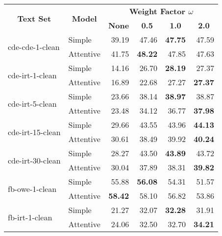 \begin{tabular}{| l | l | r | r | r | r |}
    \hline

    \multicolumn{1}{|c|}{\multirow{2}{*}{\textbf{Text Set}}} &
    \multicolumn{1}{|c|}{\multirow{2}{*}{\textbf{Model}}} &
    \multicolumn{4}{|c|}{\textbf{Weight Factor $\omega$}} \\

    &
    &
    \multicolumn{1}{|c|}{\textbf{None}} &
    \multicolumn{1}{|c|}{\textbf{0.5}} &
    \multicolumn{1}{|c|}{\textbf{1.0}} &
    \multicolumn{1}{|c|}{\textbf{2.0}} \\

    \hline \hline

    \multirow{2}{*}{cde-cde-1-clean}
    & Simple    & 39.19 & 47.46 & \textbf{47.75} & 47.59 \\
    & Attentive & 41.75 & \textbf{48.22} & 47.85 & 47.63 \\ \hline

    \multirow{2}{*}{cde-irt-1-clean}
    & Simple    & 14.16 & 26.70 & \textbf{28.19} & 27.37 \\
    & Attentive & 16.89 & 22.68 & 27.27 & \textbf{27.37} \\ \hline

    \multirow{2}{*}{cde-irt-5-clean}
    & Simple    & 23.66 & 38.14 & \textbf{38.97} & 38.87 \\
    & Attentive & 23.48 & 34.12 & 36.77 & \textbf{37.98} \\ \hline

    \multirow{2}{*}{cde-irt-15-clean}
    & Simple    & 29.66 & 43.55 & 43.96 & \textbf{44.13} \\
    & Attentive & 30.61 & 38.49 & 39.92 & \textbf{40.24} \\ \hline

    \multirow{2}{*}{cde-irt-30-clean}
    & Simple    & 28.27 & 43.50 & \textbf{43.89} & 43.72 \\
    & Attentive & 30.04 & 37.89 & 38.31 & \textbf{39.82} \\ \hline \hline

    \multirow{2}{*}{fb-owe-1-clean}
    & Simple    & 55.88 & \textbf{56.08} & 54.31 & 51.57 \\
    & Attentive & \textbf{58.42} & 58.10 & 56.82 & 53.86 \\ \hline

    \multirow{2}{*}{fb-irt-1-clean}
    & Simple    & 21.27 & 32.07 & \textbf{32.28} & 31.91 \\
    & Attentive & 24.06 & 32.50 & 32.70 & \textbf{34.21} \\ \hline


\end{tabular}
